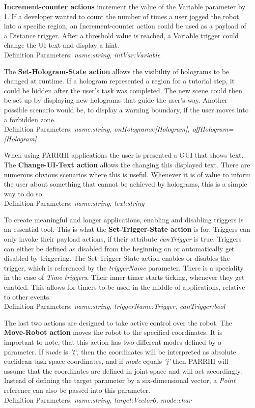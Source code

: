 \textbf{Increment-counter actions} increment the value of the Variable parameter by 1. If a developer wanted to count the number of times a user jogged the robot into a specific region, an Increment-counter action could be used as a payload of a Distance trigger. After a threshold value is reached, a Variable trigger could change the UI text and display a hint.\\Definition Parameters: \textit{name:string, intVar:Variable}

The \textbf{Set-Hologram-State action} allows the visibility of holograms to be changed at runtime. If a hologram represented a region for a tutorial step, it could be hidden after the user's task was completed. The new scene could then be set up by displaying new holograms that guide the user's way. Another possible scenario would be, to display a warning boundary, if the user moves into a forbidden zone.\\Definition Parameters: \textit{name:string, onHolograms:[Hologram], offHologram=[Hologram]}

When using PARRHI applications the user is presented a GUI that shows text. The \textbf{Change-UI-Text action} allows the changing this displayed text. There are numerous obvious scenarios where this is useful. Whenever it is of value to inform the user about something that cannot be achieved by holograms, this is a simple way to do so.\\Definition Parameters: \textit{name:string, text:string}

To create meaningful and longer applications, enabling and disabling triggers is an essential tool. This is what the \textbf{Set-Trigger-State action} is for. Triggers can only invoke their payload actions, if their attribute \textit{canTrigger} is true. Triggers can either be defined as disabled from the beginning on or automatically get disabled by triggering. The Set-Trigger-State action enables or disables the trigger, which is referenced by the \textit{triggerName} parameter. There is a speciality in the case of \textit{Time triggers}. Their inner timer starts ticking, whenever they get enabled. This allows for timers to be used in the middle of applications, relative to other events.\\Definition Parameters: \textit{name:string, triggerName:Trigger, canTrigger:bool}

The last two actions are designed to take active control over the robot. The \textbf{Move-Robot action} moves the robot to the specified coordinates. It is important to note, that this action has two different modes defined by a  parameter. If \textit{mode} is \textit{'t'}, then the coordinates will be interpreted as absolute euclidean task space coordinates, and if \textit{mode} equals \textit{'j'} then PARRHI will assume that the coordinates are defined in joint-space and will act accordingly. Instead of defining the target parameter by a six-dimensional vector, a \textit{Point} reference can also be passed into this parameter.\\Definition Parameters: \textit{name:string, target:Vector6, mode:char}

